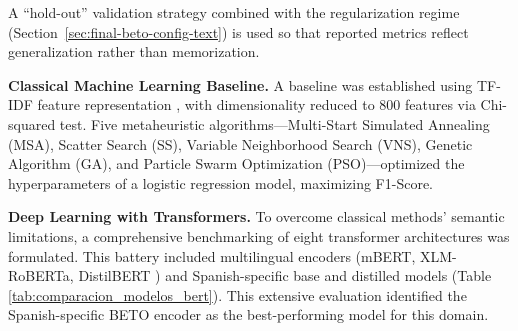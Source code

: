 \documentclass[informatics,article,submit,pdftex,moreauthors]{Definitions/mdpi}
\begin{document}
A ``hold-out'' validation strategy combined with the regularization regime (Section~\ref{sec:final-beto-config-text}) is used so that reported metrics reflect generalization rather than memorization.

\textbf{Classical Machine Learning Baseline.} A baseline was established using TF-IDF feature representation \citep{shu2017fake}, with dimensionality reduced to 800 features via Chi-squared test. Five metaheuristic algorithms—Multi-Start Simulated Annealing (MSA), Scatter Search (SS), Variable Neighborhood Search (VNS), Genetic Algorithm (GA), and Particle Swarm Optimization (PSO)—optimized the hyperparameters of a logistic regression model, maximizing F1-Score.

\textbf{Deep Learning with Transformers.} To overcome classical methods' semantic limitations, a comprehensive benchmarking of eight transformer architectures was formulated. This battery included multilingual encoders (mBERT, XLM-RoBERTa, DistilBERT \citep{sanh2019distilbert}) and Spanish-specific base and distilled models (Table \ref{tab:comparacion_modelos_bert}). This extensive evaluation identified the Spanish-specific BETO encoder as the best-performing model for this domain.

\begin{table}[H]
\centering
\caption{Comparison of the 8 Transformer models systematically evaluated for the classification task.}
\label{tab:comparacion_modelos_bert}
\end{table}
\end{document}
